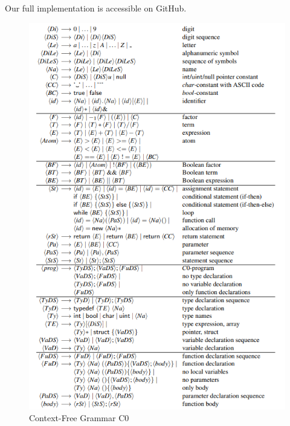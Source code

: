\documentclass[11pt]{report}
\begin{document}
    Our full implementation is accessible on GitHub.

    \begin{figure}[h!]
        \center
        \includegraphics[width=13cm]{C0.png}
        \caption{Context-Free Grammar C0}
        \label{}
    \end{figure}

    \tableofcontents
    
    
\end{document}
